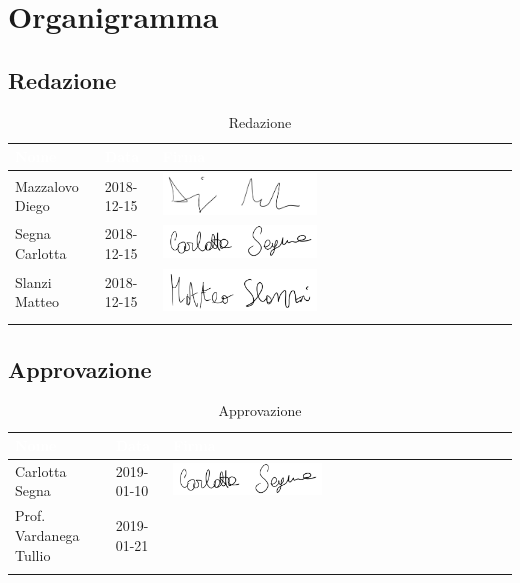 \section{Organigramma}
\label{Organigramma}


\subsection{Redazione}

\begin{longtable}{|C{.25\textwidth}|C{.16\textwidth}|C{.45\textwidth}|}
\hline
{}\textbf{\textcolor{white}{Nome}} & \textbf{\textcolor{white}{Data}} & \textbf{\textcolor{white}{Firma}}\\
\hline \hline
\endfirsthead
Mazzalovo Diego & 2018-12-15 & \includegraphics[width=0.45\textwidth]{./images/PNG/DiegoMazzalovo.png} \\
\hline
{}Segna Carlotta & 2018-12-15 & \includegraphics[width=0.45\textwidth]{./images/PNG/CarlottaSegna.png}\\
\hline
Slanzi Matteo & 2018-12-15 & \includegraphics[width=0.45\textwidth]{./images/PNG/MatteoSlanzi.png}\\
\hline
\caption{Redazione}
\label{Tabella Redazione}
\end{longtable}


\subsection{Approvazione}

\begin{longtable}{|C{.25\textwidth}|C{.16\textwidth}|C{.45\textwidth}|}
\hline
{}\textbf{\textcolor{white}{Nome}} & \textbf{\textcolor{white}{Data}} & \textbf{\textcolor{white}{Firma}}\\
\hline \hline
\endfirsthead
Carlotta Segna & 2019-01-10 & \includegraphics[width=0.45\textwidth]{./images/PNG/CarlottaSegna.png} \\
\hline
{}Prof. Vardanega Tullio & 2019-01-21 & \\
\hline
\caption{Approvazione}
\label{Tabella Approvazione}
\end{longtable}

